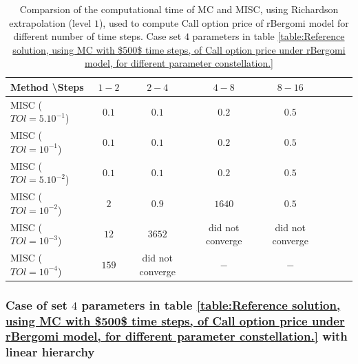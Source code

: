 \documentclass[11pt]{article}
\begin{document}
\begin{table}[h!]
\centering
\begin{tabular}{l*{6}{c}r}
Method \textbackslash  Steps            & $1-2$ & $2-4$ & $4-8$ & $8-16$ &   \\
\hline
MISC ($TOl=5.10^{-1}$)  & $0.1$ & $0.1$ & $0.2$ & $0.5$  \\
MISC ($TOl=10^{-1}$)  & $0.1$ & $0.1$ & $0.2$ & $0.5$   \\
MISC ($TOl=5.10^{-2}$)  &$0.1$ & $0.1$ & $0.2$ & $0.5$   \\
MISC ($TOl=10^{-2}$)  & $2$ & $0.9$ & $1640$ & $0.5$   \\	
MISC ($TOl=10^{-3}$)  & $12$ & $3652$ & did not converge & did not converge  \\
MISC ($TOl=10^{-4}$)  & $159$ & did not converge & $-$ & $-$   \\
\hline
\end{tabular}
\caption{Comparsion of the computational time of  MC and MISC, using Richardson extrapolation (level $1$), used to compute Call option price of rBergomi model for different number of time steps. Case set $4$ parameters in table \ref{table:Reference solution, using MC with $500$ time steps, of Call option price under rBergomi model, for different parameter constellation.}}
\label{Comparsion of the computational time of  MC and MISC, using Richardson extrapolation (level $1$), used to compute Call option price of rBergomi model for different number of time steps. Case set $4$ parameters}
\end{table}



\FloatBarrier






\subsubsection{Case of set $4$ parameters in table \ref{table:Reference solution, using MC with $500$ time steps, of Call option price under rBergomi model, for different parameter constellation.} with linear hierarchy}
\label{sec:Case of set $4$ parameters_linear}
\end{document}
